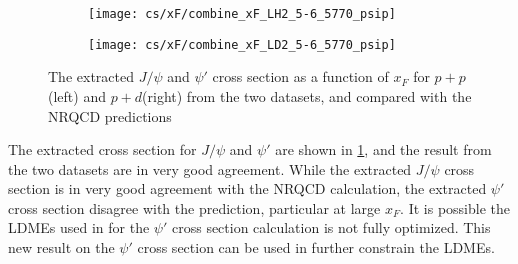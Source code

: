 \documentclass[../main.tex]{subfiles}
\begin{document}
\begin{figure}
	\centering
	\begin{subfigure}{0.45\linewidth}
		\texttt{[image: cs/xF/combine\_xF\_LH2\_5-6\_5770\_psip]}
	\end{subfigure}
	\centering
	\begin{subfigure}{0.45\linewidth}
		\texttt{[image: cs/xF/combine\_xF\_LD2\_5-6\_5770\_psip]}
	\end{subfigure}
	\caption{The extracted $J/\psi$ and $\psi'$ cross section as a function of $x_F$ for $p+p$(left)
	and $p+d$(right) from the two datasets,	and compared with the NRQCD predictions}
	\label{fig:cs_xF_combined}
\end{figure}


The extracted cross section for $J/\psi$ and $\psi'$ are shown in \cref{fig:cs_xF_combined}, and
the result from the two datasets are in very good agreement. While the extracted 
$J/\psi$ cross section is in very good agreement with the NRQCD calculation, the extracted $\psi'$ 
cross section disagree with the prediction, particular at large $x_F$. It is possible the LDMEs used 
in for the $\psi'$ cross section calculation is not fully optimized. This new result on the $\psi'$ 
cross section can be used in further constrain the LDMEs.
\end{document}
